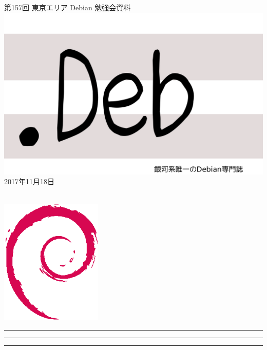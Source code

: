 \documentclass[mingoth,a4paper]{jsarticle}
\newcommand{\debmtgyear}{2017}
\newcommand{\debmtgmonth}{11}
\newcommand{\debmtgdate}{18}
\newcommand{\debmtgnumber}{157}
\begin{document}
\begin{titlepage}
\thispagestyle{empty}

\vspace*{-2cm}
第\debmtgnumber{}回 東京エリア Debian 勉強会資料\\
\hspace*{-2cm}
\includegraphics{image2012-natsu/dotdeb.pdf}\\
\hfill{}\debmtgyear{}年\debmtgmonth{}月\debmtgdate{}日

\\

\vspace*{-2cm}
\hfill{}\includegraphics[height=6cm]{image200502/openlogo-nd.eps}
\end{titlepage}

\newpage

\begin{minipage}[b]{0.2\hsize}
 \colorbox{titleback}{}
\end{minipage}
\begin{minipage}[b]{0.8\hsize}
\hrule
\vspace{2mm}
\hrule
\begin{multicols}{2}
\tableofcontents
\end{multicols}
\vspace{2mm}
\hrule
\end{minipage}
\end{document}
